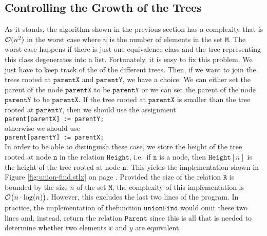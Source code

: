 \subsection{Controlling the Growth of the Trees}
As it stands, the algorithm shown in the previous section has a complexity that is $\mathcal{O}(n^2)$ in the
worst case where $n$ is the number of elements in the set $ \mathtt{M}$.  The worst case happens if there
is just one equivalence class and the tree representing this class degenerates into a list.
Fortunately, it is easy to fix this problem.  We just have to keep track of the  of the
different trees.  Then, if we want to join the trees rooted at $\mathtt{parentX}$ and
$\mathtt{parentY}$, we have a choice: We can either set the parent of the node $\mathtt{parentX}$ to
be $\mathtt{parentY}$ or we can set the parent of the node $\mathtt{parentY}$ to be $\mathtt{parentX}$.
If the tree rooted at $\mathtt{parentX}$ is smaller than the tree rooted at $\mathtt{parentY}$, then we should
use the assignment
\\[0.2cm]
\hspace*{1.3cm}
\texttt{parent[parentX] := parentY;}
\\[0.2cm]
otherwise we should use
\\[0.2cm]
\hspace*{1.3cm}
\texttt{parent[parentY] := parentX;}
\\[0.2cm]
In order to be able to distinguish these case, we store the height of the tree rooted at node
$\mathtt{n}$ in the relation $\mathtt{Height}$, i.e.~if $\mathtt{n}$ is a node, then $\mathtt{Height}[n]$ is
the height of the tree rooted at node $\mathtt{n}$.  This yields the implementation shown in Figure
\ref{fig:union-find.stlx} on page \pageref{fig:union-find.stlx}.  Provided the size  of the relation
$\mathtt{R}$ is bounded by the size $n$ of the set $ \mathtt{M}$, the complexity of this
implementation is $\mathcal{O}\bigl(n \cdot \log(n)\bigr)$.  However, this excludes the last two lines of
the program.  In practice, the implementation of thefunction $\mathtt{unionFind}$ would omit these
two lines and, instead, return the relation $\mathtt{Parent}$ since this is all that is needed to
determine whether two elements $x$ and $y$ are equivalent. 


